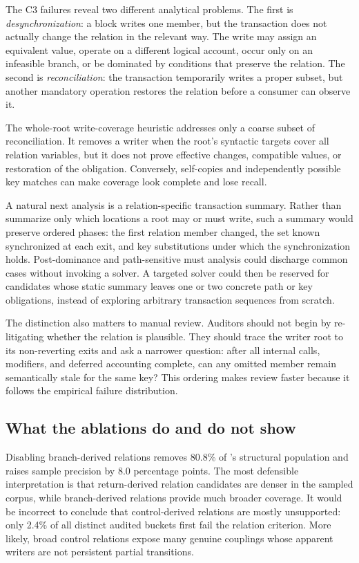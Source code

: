 The C3 failures reveal two different analytical problems. The first is \emph{desynchronization}: a block writes one member, but the transaction does not actually change the relation in the relevant way. The write may assign an equivalent value, operate on a different logical account, occur only on an infeasible branch, or be dominated by conditions that preserve the relation. The second is \emph{reconciliation}: the transaction temporarily writes a proper subset, but another mandatory operation restores the relation before a consumer can observe it.

The whole-root write-coverage heuristic addresses only a coarse subset of reconciliation. It removes a writer when the root's syntactic targets cover all relation variables, but it does not prove effective changes, compatible values, or restoration of the obligation. Conversely, self-copies and independently possible key matches can make coverage look complete and lose recall.

A natural next analysis is a relation-specific transaction summary. Rather than summarize only which locations a root may or must write, such a summary would preserve ordered phases: the first relation member changed, the set known synchronized at each exit, and key substitutions under which the synchronization holds. Post-dominance and path-sensitive must analysis could discharge common cases without invoking a solver. A targeted solver could then be reserved for candidates whose static summary leaves one or two concrete path or key obligations, instead of exploring arbitrary transaction sequences from scratch.

The distinction also matters to manual review. Auditors should not begin by re-litigating whether the relation is plausible. They should trace the writer root to its non-reverting exits and ask a narrower question: after all internal calls, modifiers, and deferred accounting complete, can any omitted member remain semantically stale for the same key? This ordering makes review faster because it follows the empirical failure distribution.

\subsection{What the ablations do and do not show}
\label{s:discussion-ablations}

Disabling branch-derived relations removes 80.8\% of 's structural population and raises sample precision by 8.0 percentage points. The most defensible interpretation is that return-derived relation candidates are denser in the sampled corpus, while branch-derived relations provide much broader coverage. It would be incorrect to conclude that control-derived relations are mostly unsupported: only 2.4\% of all distinct audited buckets first fail the relation criterion. More likely, broad control relations expose many genuine couplings whose apparent writers are not persistent partial transitions.

